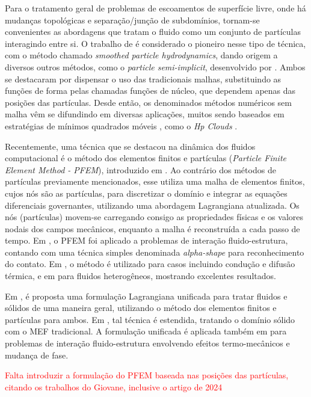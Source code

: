 \documentclass[Tese.tex]{subfiles}
\begin{document}
Para o tratamento geral de problemas de escoamentos de superfície livre, onde há mudanças topológicas e separação/junção de subdomínios, tornam-se convenientes as abordagens que tratam o fluido como um conjunto de partículas interagindo entre si. O trabalho de  é considerado o pioneiro nesse tipo de técnica, com o método chamado \textit{smoothed particle hydrodynamics}, dando origem a diversos outros métodos, como o \textit{particle semi-implicit}, desenvolvido por . Ambos se destacaram por dispensar o uso das tradicionais malhas, substituindo as funções de forma pelas chamadas funções de núcleo, que dependem apenas das posições das partículas. Desde então, os denominados métodos numéricos sem malha vêm se difundindo em diversas aplicações, muitos sendo baseados em estratégias de mínimos quadrados móveis \cite{Lancaster1981}, como o \textit{Hp Clouds} \cite{HpClouds}.

Recentemente, uma técnica que se destacou na dinâmica dos fluidos computacional é o método dos elementos finitos e partículas
(\textit{Particle Finite Element Method - PFEM}), introduzido em . Ao contrário dos métodos de partículas previamente mencionados, esse utiliza uma malha de elementos finitos, cujos nós são as partículas, para discretizar o domínio e integrar as equações diferenciais governantes, utilizando uma abordagem Lagrangiana atualizada. Os nós (partículas) movem-se carregando consigo as propriedades físicas e os valores nodais dos campos mecânicos, enquanto a malha é reconstruída a cada passo de tempo. Em , o PFEM foi aplicado a problemas de interação fluido-estrutura, contando com uma técnica simples denominada \textit{alpha-shape} para reconhecimento do contato. Em , o método é utilizado para casos incluindo condução e difusão térmica, e em  para fluidos heterogêneos, mostrando excelentes resultados.

Em , é proposta uma formulação Lagrangiana unificada para tratar fluidos e sólidos de uma maneira geral, utilizando o método dos elementos finitos e partículas para ambos. Em , tal técnica é estendida, tratando o domínio sólido com o MEF tradicional. A formulação unificada é aplicada também em  para problemas de interação fluido-estrutura envolvendo efeitos termo-mecânicos e mudança de fase. 

\textcolor{red}{Falta introduzir a formulação do PFEM baseada nas posições das partículas, citando os trabalhos do Giovane, inclusive o artigo de 2024}
\end{document}
